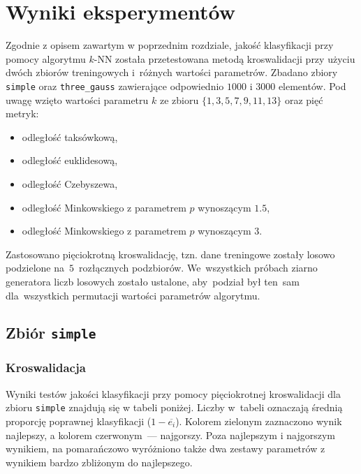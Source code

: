 \documentclass[11pt,a4paper]{article}
\begin{document}
\section{Wyniki eksperymentów}

Zgodnie z opisem zawartym w poprzednim rozdziale, jakość klasyfikacji przy pomocy algorytmu $k$-NN została przetestowana metodą kroswalidacji przy użyciu dwóch zbiorów treningowych i~różnych wartości parametrów. Zbadano zbiory {\tt simple} oraz {\tt three\_gauss} zawierające odpowiednio $1000$ i $3000$ elementów. Pod uwagę wzięto wartości parametru $k$ ze zbioru $\{1, 3, 5, 7, 9, 11, 13\}$ oraz pięć metryk:
\begin{itemize}
    \setlength\itemsep{-.4em}
    \item odległość taksówkową,
    \item odległość euklidesową,
    \item odległość Czebyszewa,
    \item odległość Minkowskiego z parametrem $p$ wynoszącym $1.5$,
    \item odległość Minkowskiego z parametrem $p$ wynoszącym $3$.
\end{itemize}
Zastosowano pięciokrotną kroswalidację, tzn. dane treningowe zostały losowo podzielone na~$5$~rozłącznych podzbiorów.
We~wszystkich próbach ziarno generatora liczb losowych zostało ustalone, aby~podział był ten~sam dla~wszystkich permutacji wartości parametrów algorytmu.

\subsection{Zbiór {\tt simple}}

\subsubsection{Kroswalidacja}

Wyniki testów jakości klasyfikacji przy pomocy pięciokrotnej kroswalidacji dla zbioru {\tt simple} znajdują się w tabeli poniżej.
Liczby w~tabeli oznaczają średnią proporcję poprawnej klasyfikacji ($1 - \overline{e_i}$).
Kolorem zielonym zaznaczono wynik najlepszy, a kolorem czerwonym~--- najgorszy. Poza najlepszym i najgorszym wynikiem, na pomarańczowo wyróżniono także dwa zestawy parametrów z wynikiem bardzo zbliżonym do najlepszego.
\end{document}

